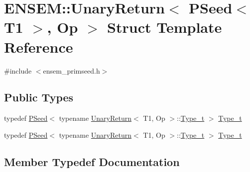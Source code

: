\hypertarget{structENSEM_1_1UnaryReturn_3_01PSeed_3_01T1_01_4_00_01Op_01_4}{}\section{E\+N\+S\+EM\+:\+:Unary\+Return$<$ P\+Seed$<$ T1 $>$, Op $>$ Struct Template Reference}
\label{structENSEM_1_1UnaryReturn_3_01PSeed_3_01T1_01_4_00_01Op_01_4}


{\ttfamily \#include $<$ensem\+\_\+primseed.\+h$>$}

\subsection*{Public Types}
\begin{DoxyCompactItemize}
\item 
typedef \mbox{\hyperlink{classENSEM_1_1PSeed}{P\+Seed}}$<$ typename \mbox{\hyperlink{structENSEM_1_1UnaryReturn}{Unary\+Return}}$<$ T1, Op $>$\+::\mbox{\hyperlink{structENSEM_1_1UnaryReturn_3_01PSeed_3_01T1_01_4_00_01Op_01_4_a6145e0773bb5bec6d51ec81ef1837329}{Type\+\_\+t}} $>$ \mbox{\hyperlink{structENSEM_1_1UnaryReturn_3_01PSeed_3_01T1_01_4_00_01Op_01_4_a6145e0773bb5bec6d51ec81ef1837329}{Type\+\_\+t}}
\item 
typedef \mbox{\hyperlink{classENSEM_1_1PSeed}{P\+Seed}}$<$ typename \mbox{\hyperlink{structENSEM_1_1UnaryReturn}{Unary\+Return}}$<$ T1, Op $>$\+::\mbox{\hyperlink{structENSEM_1_1UnaryReturn_3_01PSeed_3_01T1_01_4_00_01Op_01_4_a6145e0773bb5bec6d51ec81ef1837329}{Type\+\_\+t}} $>$ \mbox{\hyperlink{structENSEM_1_1UnaryReturn_3_01PSeed_3_01T1_01_4_00_01Op_01_4_a6145e0773bb5bec6d51ec81ef1837329}{Type\+\_\+t}}
\end{DoxyCompactItemize}


\subsection{Member Typedef Documentation}
\mbox{\label{structENSEM_1_1UnaryReturn_3_01PSeed_3_01T1_01_4_00_01Op_01_4_a6145e0773bb5bec6d51ec81ef1837329}} 
